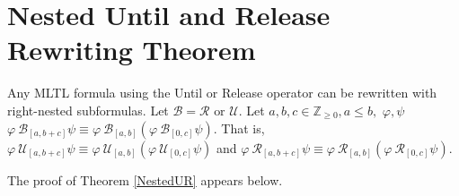 \documentclass[runningheads]{llncs}
\renewcommand{\phi}{\varphi}
\begin{document}
\section{Nested Until and Release Rewriting Theorem} \label{Appendix-NestedUR}
\begingroup
\renewcommand\thetheorem{3}
 \begin{theorem}
   Any MLTL formula using the Until or Release operator can be rewritten with right-nested subformulas. Let $\mathcal{B} = \mathcal{R} \text{ or } \mathcal{U}$. Let $a,b,c \in \mathbb{Z}_{\geq 0} , a \leq b,$  $ \phi,   \psi$  $ \phi \ \mathcal{B}_{[a,b+c]} \psi \equiv \phi \ \mathcal{B}_{[a,b]}(\phi \ \mathcal{B}_{[0,c]} \psi)$. That is, $ \phi \ \mathcal{U}_{[a,b+c]} \psi \equiv \phi \ \mathcal{U}_{[a,b]}(\phi \ \mathcal{U}_{[0,c]} \psi)$ and $ \phi \ \mathcal{R}_{[a,b+c]} \psi \equiv \phi \ \mathcal{R}_{[a,b]}(\phi \ \mathcal{R}_{[0,c]} \psi)$.
\end{theorem}
\endgroup
The proof of Theorem \ref{NestedUR} appears below.
\end{document}
